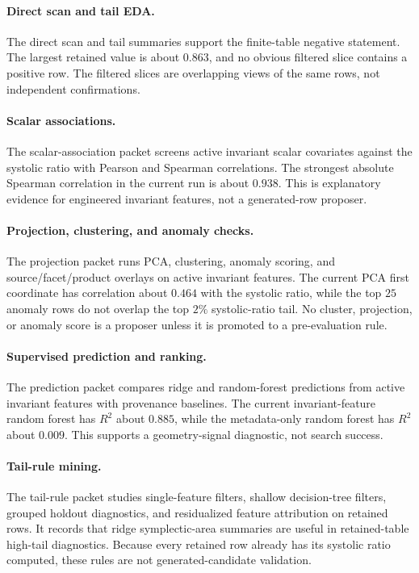 \paragraph{Direct scan and tail EDA.}
The direct scan and tail summaries support the finite-table negative statement.
The largest retained value is about \(0.863\), and no obvious filtered slice
contains a positive row.  The filtered slices are overlapping views of the same
rows, not independent confirmations.

\paragraph{Scalar associations.}
The scalar-association packet screens active invariant scalar covariates
against the systolic ratio with Pearson and Spearman correlations.  The
strongest absolute Spearman correlation in the current run is about \(0.938\).
This is explanatory evidence for engineered invariant features, not a
generated-row proposer.

\paragraph{Projection, clustering, and anomaly checks.}
The projection packet runs PCA, clustering, anomaly scoring, and
source/facet/product overlays on active invariant features.  The current PCA
first coordinate has correlation about \(0.464\) with the systolic ratio, while
the top \(25\) anomaly rows do not overlap the top \(2\%\) systolic-ratio tail.
No cluster, projection, or anomaly score is a proposer unless it is promoted to
a pre-evaluation rule.

\paragraph{Supervised prediction and ranking.}
The prediction packet compares ridge and random-forest predictions from active
invariant features with provenance baselines.  The current invariant-feature
random forest has \(R^2\) about \(0.885\), while the metadata-only random
forest has \(R^2\) about \(0.009\).  This supports a geometry-signal diagnostic,
not search success.

\paragraph{Tail-rule mining.}
The tail-rule packet studies single-feature filters, shallow decision-tree
filters, grouped holdout diagnostics, and residualized feature attribution on
retained rows.  It records that ridge symplectic-area summaries are useful in
retained-table high-tail diagnostics.  Because every retained row already has
its systolic ratio computed, these rules are not generated-candidate
validation.

